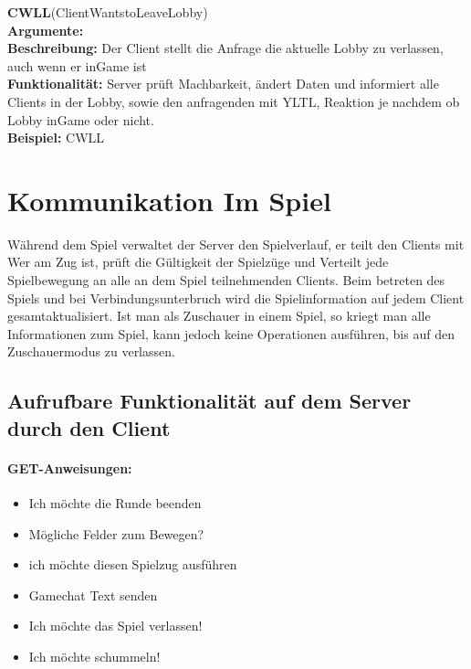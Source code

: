\documentclass[a4paper, 12pt, oneside, headsepline=.5pt,footsepline=.5pt]{scrartcl}
\begin{document}
{\large \textbf{CWLL}(ClientWantstoLeaveLobby)} \\
\hspace{4ex} \textbf{Argumente:} {} \\
\hspace{4ex} \textbf{Beschreibung:} {Der Client stellt die Anfrage die aktuelle Lobby zu verlassen, auch wenn er inGame ist} \\
\hspace{4ex} \textbf{Funktionalität:} {Server prüft Machbarkeit, ändert Daten und informiert alle Clients in der Lobby, sowie den anfragenden mit YLTL, Reaktion je nachdem ob Lobby inGame oder nicht.} \\
\hspace{4ex} \textbf{Beispiel:} {CWLL} \\

\newpage
\section{Kommunikation Im Spiel}
Während dem Spiel verwaltet der Server den Spielverlauf, er teilt den Clients mit Wer am Zug ist, prüft die Gültigkeit der Spielzüge und Verteilt jede Spielbewegung an alle an dem Spiel teilnehmenden Clients. Beim betreten des Spiels und bei Verbindungsunterbruch wird die Spielinformation auf jedem Client gesamtaktualisiert. Ist man als Zuschauer in einem Spiel, so kriegt man alle Informationen zum Spiel, kann jedoch keine Operationen ausführen, bis auf den Zuschauermodus zu verlassen.

\subsection{Aufrufbare Funktionalität auf dem Server durch den Client}

\paragraph{\textbf GET-Anweisungen:}
\begin{itemize}
\item Ich möchte die Runde beenden
\item Mögliche Felder zum Bewegen?
\item ich möchte diesen Spielzug ausführen
\item Gamechat Text senden
\item Ich möchte das Spiel verlassen!
\item Ich möchte schummeln!
\end{itemize}
\end{document}
